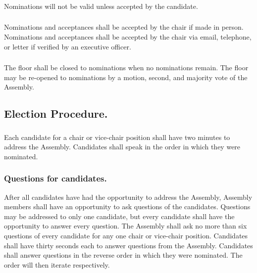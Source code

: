 \documentclass{rules}
\begin{document}
\subsubsection{}
Nominations will not be valid unless accepted by the candidate. 
\subsubsection{}
Nominations and acceptances shall be accepted by the chair if made in person.  Nominations and acceptances shall be accepted by the chair via email, telephone, or letter if verified by an executive officer.
\subsubsection{}
The floor shall be closed to nominations when no nominations remain.  The floor may be re-opened to nominations by a motion, second, and majority vote of the Assembly.
\subsection{Election Procedure.}
\subsubsection{}
Each candidate for a chair or vice-chair position shall have two minutes to address the Assembly.  Candidates shall speak in the order in which they were nominated.
\subsubsection{Questions for candidates.}
\subsubsubsection{}
After all candidates have had the opportunity to address the Assembly, Assembly members shall have an opportunity to ask questions of the candidates.
\subsubsubsection{}
Questions may be addressed to only one candidate, but every candidate shall have the opportunity to answer every question.
\subsubsubsection{}
The Assembly shall ask no more than six questions of every candidate for any one chair or vice-chair position.
\subsubsubsection{}
Candidates shall have thirty seconds each to answer questions from the Assembly.
\subsubsubsection{}
Candidates shall answer questions in the reverse order in which they were nominated.  The order will then iterate respectively.
\end{document}
